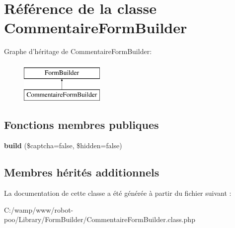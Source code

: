 \hypertarget{class_library_1_1_form_builder_1_1_commentaire_form_builder}{\section{Référence de la classe Commentaire\+Form\+Builder}
\label{class_library_1_1_form_builder_1_1_commentaire_form_builder}
}
Graphe d'héritage de Commentaire\+Form\+Builder\+:\begin{figure}[H]
\begin{center}
\leavevmode
\includegraphics[height=2.000000cm]{class_library_1_1_form_builder_1_1_commentaire_form_builder}
\end{center}
\end{figure}
\subsection*{Fonctions membres publiques}
\begin{DoxyCompactItemize}
\item 
\hypertarget{class_library_1_1_form_builder_1_1_commentaire_form_builder_a7fd92073a4c31275663c4fc614edaba2}{{\bfseries build} (\$captcha=false, \$hidden=false)}\label{class_library_1_1_form_builder_1_1_commentaire_form_builder_a7fd92073a4c31275663c4fc614edaba2}

\end{DoxyCompactItemize}
\subsection*{Membres hérités additionnels}


La documentation de cette classe a été générée à partir du fichier suivant \+:\begin{DoxyCompactItemize}
\item 
C\+:/wamp/www/robot-\/poo/\+Library/\+Form\+Builder/Commentaire\+Form\+Builder.\+class.\+php\end{DoxyCompactItemize}
